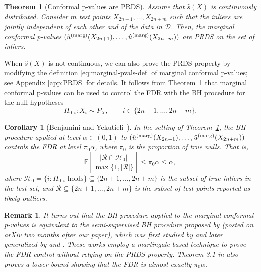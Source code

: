 \documentclass[11pt]{article}
\newtheorem{thm}{Theorem}
\newtheorem{cor}{Corollary}
\newtheorem{remark}{Remark}
\def\E{\mathbb{E}}
\def\marg{\textnormal{(marg)}}
\begin{document}
\begin{thm}[Conformal p-values are PRDS] \label{thm:prds}
{Assume that $\hat{s}(X)$ is continuously distributed.} Consider $m$ test points $X_{2n+1},\dots,X_{2n+m}$ such that the inliers are jointly independent of each other and of the data in $\mathcal{D}$. Then, the marginal conformal p-values $(\hat{u}^\marg(X_{2n+1}),\dots,\hat{u}^\marg(X_{2n+m}))$ are PRDS on the set of inliers.
\end{thm}
{When $\hat{s}(X)$ is not continuous, we can also prove the PRDS property by modifying the definition \eqref{eq:marginal-pvals-def} of marginal conformal p-values; see Appendix \ref{app:PRDS} for details. }It follows from Theorem~\ref{thm:prds} that marginal conformal p-values can be used to control the FDR with the BH procedure for the null hypotheses
\begin{equation*}
    H_{0,i} : X_i \sim P_X, \qquad i \in \{2n+1,\dots,2n+m\}.
\end{equation*}
\begin{cor}[Benjamini and Yekutieli~\cite{benjamini2001control}]\label{cor:BH_FDR}
In the setting of Theorem~\ref{thm:prds}, the BH procedure applied at level $\alpha \in (0,1)$ to $(\hat{u}^\marg(X_{2n+1}),\dots,\hat{u}^\marg(X_{2n+m}))$ controls the FDR at level $\pi_0\alpha$, where $\pi_0$ is the proportion of true nulls. That is,
\begin{equation}
    \E\left[\frac{|\mathcal{R} \cap \mathcal{H}_0|}{\max\{1, |\mathcal{R}|\} } \right] \le \pi_0\alpha\le \alpha,
\end{equation}
where $\mathcal{H}_0 = \{i : H_{0,i} \text{ holds}\} \subseteq \{2n+1,\dots,2n+m\}$ is the subset of true inliers in the test set, and $\mathcal{R} \subseteq \{2n+1,\dots,2n+m\}$ is the subset of test points reported as likely outliers. 
\end{cor}

\begin{remark}
It turns out that the BH procedure applied to the marginal conformal p-values is equivalent to the semi-supervised BH procedure proposed by \cite{mary2021semi} (posted on arXiv two months after our paper), which was first studied by \cite{weinstein2017power} and later generalized by \cite{yang2021bonus} and \cite{rava2021burden}. These works employ a martingale-based technique to prove the FDR control without relying on the PRDS property. Theorem 3.1 in \cite{mary2021semi} also proves a lower bound showing that the FDR is almost exactly $\pi_0 \alpha$. 
\end{remark}
\end{document}

